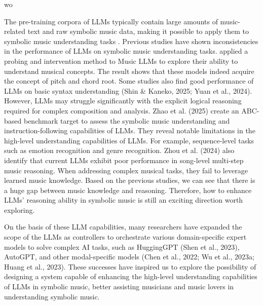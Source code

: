 wo\documentclass[sigconf]{acmart}
\begin{document}
The pre-training corpora of LLMs typically contain large amounts of music-related text and raw symbolic music data, making it possible to apply them to symbolic music understanding tasks \citep{zhouCanLLMsReason2024a}. Previous studies have shown inconsistencies in the performance of LLMs on symbolic music understanding tasks. \citet{maMusicLLMsLearn2024} applied a probing and intervention method to Music LLMs to explore their ability to understand musical concepts. The result shows that these models indeed acquire the concept of pitch and chord root. Some studies also find good performance of LLMs on basic syntax understanding \citep{shinLargeLanguageModels2025}\citep{yuanChatMusicianUnderstandingGenerating2024a}(Shin \& Kaneko, 2025; Yuan et al., 2024). However, LLMs may struggle significantly with the explicit logical reasoning required for complex composition and analysis. \citet{zhaoABCEvalBenchmarkingLarge2025}Zhao et al. (2025) create an ABC-based benchmark target to assess the symbolic music understanding and instruction-following capabilities of LLMs. They reveal notable limitations in the high-level understanding capabilities of LLMs. For example, sequence-level tasks such as emotion recognition and genre recognition. \citet{zhouCanLLMsReason2024a}Zhou et al. (2024) also identify that current LLMs exhibit poor performance in song-level multi-step music reasoning. When addressing complex musical tasks, they fail to leverage learned music knowledge. Based on the previous studies, we can see that there is a huge gap between music knowledge and reasoning. Therefore, how to enhance LLMs' reasoning ability in symbolic music is still an exciting direction worth exploring.

On the basis of these LLM capabilities, many researchers have expanded the scope of the LLMs as controllers to orchestrate various domain-specific expert models to solve complex AI tasks, such as HuggingGPT \citep{shenHuggingGPTSolvingAI2023}(Shen et al., 2023), AutoGPT, and other modal-specific models \citep{chenVisualGPTDataefficientAdaptation2022}\citep{wuVisualChatGPTTalking2023}\citep{huangAudioGPTUnderstandingGenerating2023}(Chen et al., 2022; Wu et al., 2023a; Huang et al., 2023). These successes have inspired us to explore the possibility of designing a system capable of enhancing the high-level understanding capabilities of LLMs in symbolic music, better assisting musicians and music lovers in understanding symbolic music.
\end{document}
